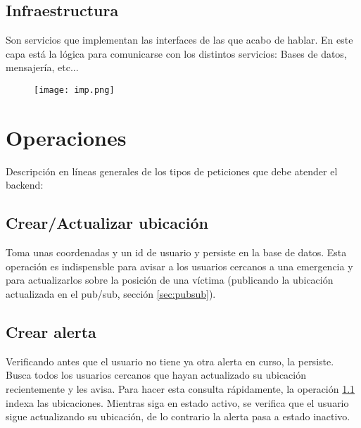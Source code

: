 \subsection{Infraestructura} 
Son servicios que implementan las interfaces de las que acabo de hablar.
En este capa está la lógica para comunicarse con los distintos servicios: Bases de datos, mensajería, etc...
\begin{figure}[H]
	\centering	
	\texttt{[image: imp.png]}
	\end{figure}


\section{Operaciones}

Descripción en líneas generales de los tipos de peticiones que debe atender el backend:

\subsection{Crear/Actualizar ubicación}\label{op:ubi}
Toma unas coordenadas y un id de usuario y persiste en la base de datos.
Esta operación es indispensble para avisar a los usuarios cercanos a una emergencia y para 
actualizarlos sobre la posición de una víctima (publicando la ubicación actualizada en el pub/sub, sección \ref{sec:pubsub}).

\subsection{Crear alerta}
Verificando antes que el usuario no tiene ya otra alerta en curso, la persiste.
Busca todos los usuarios cercanos que hayan actualizado su ubicación recientemente y les avisa. Para hacer
esta consulta rápidamente, la operación \ref{op:ubi} indexa las ubicaciones.
Mientras siga en estado activo, se verifica que el usuario sigue actualizando su ubicación, de lo contrario la alerta pasa a estado inactivo.

